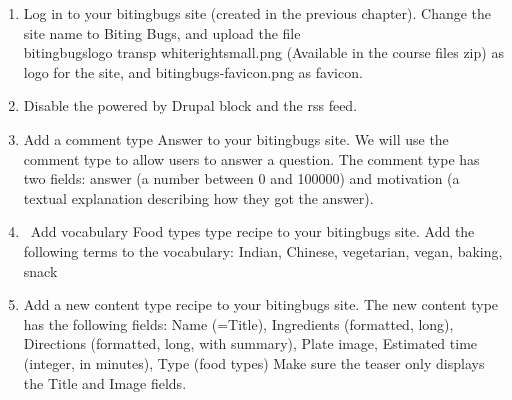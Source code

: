 \begin{enumerate}
    \item Log in to your bitingbugs site (created in the previous chapter). Change the site name to Biting Bugs, and upload the file \\ bitingbugs\textunderscore \textunderscore logo \textunderscore transp \textunderscore white\textunderscore right\textunderscore small.png (Available in the course files zip) as logo for the site, and bitingbugs-favicon.png as favicon.
    \item Disable the powered by Drupal block and the rss feed.
    \item Add a comment type Answer to your bitingbugs site. We will use the comment type to allow users to answer a question. The comment type has two fields: answer (a number between 0 and 100000) and motivation (a textual explanation describing how they got the answer).
    \item\ Add vocabulary Food types type recipe to your bitingbugs site. Add the following terms to the vocabulary: Indian, Chinese, vegetarian, vegan, baking, snack
    \item Add a new content type recipe to your bitingbugs site. The new content type has the following fields: Name (=Title), Ingredients (formatted, long), Directions (formatted, long, with summary), Plate image, Estimated time (integer, in minutes), Type (food types)
    Make sure the teaser only displays the Title and Image fields.
\end{enumerate}
